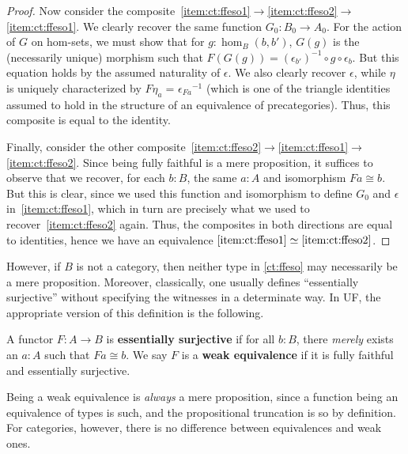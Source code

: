 \documentclass{amsart}
\newcommand{\id}[3][]{\ensuremath{#2 =_{#1} #3}\xspace}
\newcommand{\eqv}[2]{\ensuremath{#1 \simeq #2}\xspace}
\theoremstyle{definition}
\theoremstyle{remark}
\numberwithin{equation}{section}
\newcommand{\inv}[1]{{#1}^{-1}}
\begin{document}
\begin{proof}
  Now consider the composite~\ref{item:ct:ffeso1}$\to$\ref{item:ct:ffeso2}$\to$\ref{item:ct:ffeso1}.
  We clearly recover the same function $G_0:B_0 \to A_0$.
  For the action of $G$ on hom-sets, we must show that for $g:\hom_B(b,b')$, $G(g)$ is the (necessarily unique) morphism such that $F(G(g)) = \inv{(\epsilon_{b'})}\circ g \circ \epsilon_b$.
  But this equation holds by the assumed naturality of $\epsilon$.
  We also clearly recover $\epsilon$, while $\eta$ is uniquely characterized by $\id{F\eta_a}{\inv{\epsilon_{Fa}}}$ (which is one of the triangle identities assumed to hold in the structure of an equivalence of precategories).
  Thus, this composite is equal to the identity.

  Finally, consider the other composite~\ref{item:ct:ffeso2}$\to$\ref{item:ct:ffeso1}$\to$\ref{item:ct:ffeso2}.
  Since being fully faithful is a mere proposition, it suffices to observe that we recover, for each $b:B$, the same $a:A$ and isomorphism $F a \cong b$.
  But this is clear, since we used this function and isomorphism to define $G_0$ and $\epsilon$ in~\ref{item:ct:ffeso1}, which in turn are precisely what we used to recover~\ref{item:ct:ffeso2} again.
  Thus, the composites in both directions are equal to identities, hence we have an equivalence \eqv{\ref{item:ct:ffeso1}}{\ref{item:ct:ffeso2}}.
\end{proof}

However, if $B$ is not a category, then neither type in \autoref{ct:ffeso} may necessarily be a mere proposition.
Moreover, classically, one usually defines ``essentially surjective'' without specifying the witnesses in a determinate way.
In UF, the appropriate version of this definition is the following.

\begin{defn}
  A functor $F:A\to B$ is \textbf{essentially surjective} if for all $b:B$, there \emph{merely} exists an $a:A$ such that $Fa\cong b$.
  We say $F$ is a \textbf{weak equivalence} if it is fully faithful and essentially surjective.
\end{defn}

Being a weak equivalence is \emph{always} a mere proposition, since a function being an equivalence of types is such, and the propositional truncation is so by definition.
For categories, however, there is no difference between equivalences and weak ones.
\end{document}
